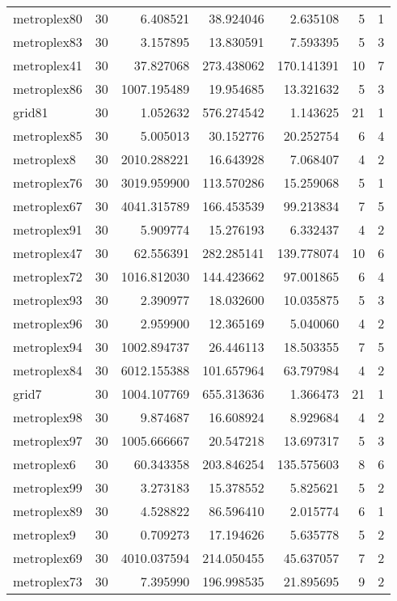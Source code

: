\begin{longtable}{|l|r|r|r|r|r|r|}
metroplex80 & 30 & 6.408521 & 38.924046 & 2.635108 & 5 & 1 \\
metroplex83 & 30 & 3.157895 & 13.830591 & 7.593395 & 5 & 3 \\
metroplex41 & 30 & 37.827068 & 273.438062 & 170.141391 & 10 & 7 \\
metroplex86 & 30 & 1007.195489 & 19.954685 & 13.321632 & 5 & 3 \\
grid81 & 30 & 1.052632 & 576.274542 & 1.143625 & 21 & 1 \\
metroplex85 & 30 & 5.005013 & 30.152776 & 20.252754 & 6 & 4 \\
metroplex8 & 30 & 2010.288221 & 16.643928 & 7.068407 & 4 & 2 \\
metroplex76 & 30 & 3019.959900 & 113.570286 & 15.259068 & 5 & 1 \\
metroplex67 & 30 & 4041.315789 & 166.453539 & 99.213834 & 7 & 5 \\
metroplex91 & 30 & 5.909774 & 15.276193 & 6.332437 & 4 & 2 \\
metroplex47 & 30 & 62.556391 & 282.285141 & 139.778074 & 10 & 6 \\
metroplex72 & 30 & 1016.812030 & 144.423662 & 97.001865 & 6 & 4 \\
metroplex93 & 30 & 2.390977 & 18.032600 & 10.035875 & 5 & 3 \\
metroplex96 & 30 & 2.959900 & 12.365169 & 5.040060 & 4 & 2 \\
metroplex94 & 30 & 1002.894737 & 26.446113 & 18.503355 & 7 & 5 \\
metroplex84 & 30 & 6012.155388 & 101.657964 & 63.797984 & 4 & 2 \\
grid7 & 30 & 1004.107769 & 655.313636 & 1.366473 & 21 & 1 \\
metroplex98 & 30 & 9.874687 & 16.608924 & 8.929684 & 4 & 2 \\
metroplex97 & 30 & 1005.666667 & 20.547218 & 13.697317 & 5 & 3 \\
metroplex6 & 30 & 60.343358 & 203.846254 & 135.575603 & 8 & 6 \\
metroplex99 & 30 & 3.273183 & 15.378552 & 5.825621 & 5 & 2 \\
metroplex89 & 30 & 4.528822 & 86.596410 & 2.015774 & 6 & 1 \\
metroplex9 & 30 & 0.709273 & 17.194626 & 5.635778 & 5 & 2 \\
metroplex69 & 30 & 4010.037594 & 214.050455 & 45.637057 & 7 & 2 \\
metroplex73 & 30 & 7.395990 & 196.998535 & 21.895695 & 9 & 2 \\

\end{longtable}

